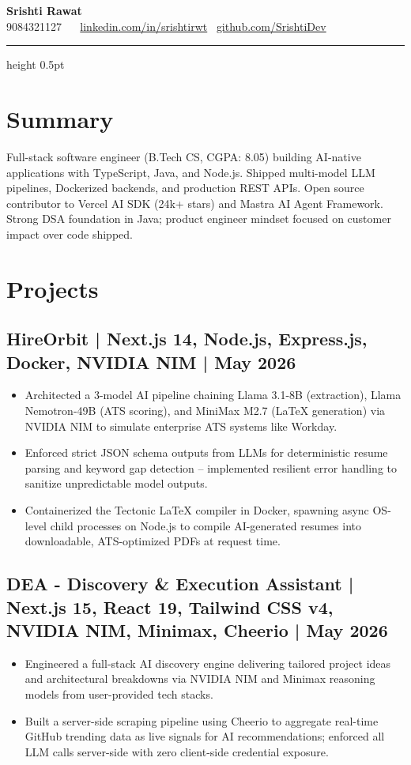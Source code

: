 \documentclass[11pt,letterpaper]{article}
\begin{document}
\textbf{\LARGE Srishti Rawat}\\[6pt]
9084321127 \textbullet\  \textbullet\ \href{https://linkedin.com/in/srishtirwt}{linkedin.com/in/srishtirwt} \textbullet\ \href{https://github.com/SrishtiDev}{github.com/SrishtiDev}

\hrule height 0.5pt\vskip 6pt

\section*{Summary}
Full-stack software engineer (B.Tech CS, CGPA: 8.05) building AI-native applications with TypeScript, Java, and Node.js. Shipped multi-model LLM pipelines, Dockerized backends, and production REST APIs. Open source contributor to Vercel AI SDK (24k+ stars) and Mastra AI Agent Framework. Strong DSA foundation in Java; product engineer mindset focused on customer impact over code shipped.

\section*{Projects}

\subsection*{HireOrbit | Next.js 14, Node.js, Express.js, Docker, NVIDIA NIM | May 2026}
\begin{itemize}
    \item Architected a 3-model AI pipeline chaining Llama 3.1-8B (extraction), Llama Nemotron-49B (ATS scoring), and MiniMax M2.7 (LaTeX generation) via NVIDIA NIM to simulate enterprise ATS systems like Workday.
    \item Enforced strict JSON schema outputs from LLMs for deterministic resume parsing and keyword gap detection -- implemented resilient error handling to sanitize unpredictable model outputs.
    \item Containerized the Tectonic LaTeX compiler in Docker, spawning async OS-level child processes on Node.js to compile AI-generated resumes into downloadable, ATS-optimized PDFs at request time.
\end{itemize}

\subsection*{DEA - Discovery \& Execution Assistant | Next.js 15, React 19, Tailwind CSS v4, NVIDIA NIM, Minimax, Cheerio | May 2026}
\begin{itemize}
    \item Engineered a full-stack AI discovery engine delivering tailored project ideas and architectural breakdowns via NVIDIA NIM and Minimax reasoning models from user-provided tech stacks.
    \item Built a server-side scraping pipeline using Cheerio to aggregate real-time GitHub trending data as live signals for AI recommendations; enforced all LLM calls server-side with zero client-side credential exposure.
\end{itemize}
\end{document}
